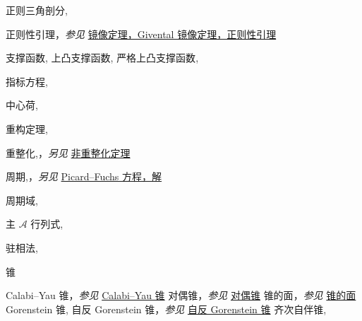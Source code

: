 \begin{theindex}
\indexspace
\item \leavevmode\hypertarget{idx:1226}{正则三角剖分},\enspace{}
\indexspace
\item \leavevmode\hypertarget{idx:1227}{正则性引理}，\textit{参见} \hyperlink{idx:0861}{镜像定理，Givental 镜像定理，正则性引理}
\indexspace
\item \leavevmode\hypertarget{idx:1314}{支撑函数},\enspace{}
\subitem \leavevmode\hypertarget{idx:1315}{上凸支撑函数},\enspace{}
\subsubitem \leavevmode\hypertarget{idx:1316}{严格上凸支撑函数},\enspace{}
\indexspace
\item \leavevmode\hypertarget{idx:0621}{指标方程},\enspace{}
\indexspace
\item \leavevmode\hypertarget{idx:0119}{中心荷},\enspace{}
\indexspace
\item \leavevmode\hypertarget{idx:1208}{重构定理},\enspace{}
\indexspace
\item \leavevmode\hypertarget{idx:1229}{重整化},\enspace{}，\textit{另见} \hyperlink{idx:0944}{非重整化定理}
\indexspace
\item \leavevmode\hypertarget{idx:1038}{周期},\enspace{}，\textit{另见} \hyperlink{idx:1059}{Picard--Fuchs 方程，解}
\indexspace
\item \leavevmode\hypertarget{idx:1039}{周期域},\enspace{}
\indexspace
\item \leavevmode\hypertarget{idx:1093}{主 $\mathcal A$ 行列式},\enspace{}
\indexspace
\item \leavevmode\hypertarget{idx:1286}{驻相法},\enspace{}
\indexspace
\item \leavevmode\hypertarget{idx:0149}{锥}
\subitem \leavevmode\hypertarget{idx:0150}{Calabi--Yau 锥}，\textit{参见} \hyperlink{idx:0110}{Calabi--Yau 锥}
\subitem \leavevmode\hypertarget{idx:0151}{对偶锥}，\textit{参见} \hyperlink{idx:0224}{对偶锥}
\subitem \leavevmode\hypertarget{idx:0152}{锥的面}，\textit{参见} \hyperlink{idx:0296}{锥的面}
\subitem \leavevmode\hypertarget{idx:0153}{Gorenstein 锥},\enspace{}
\subsubitem \leavevmode\hypertarget{idx:0154}{自反 Gorenstein 锥}，\textit{参见} \hyperlink{idx:1213}{自反 Gorenstein 锥}
\subitem \leavevmode\hypertarget{idx:0155}{齐次自伴锥},\enspace{}

\end{theindex}

